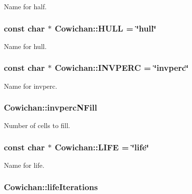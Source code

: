 Name for half. \hypertarget{class_cowichan_c0ca862afefd5d6ab8fefdbf47428b21}{
\subsubsection[{HULL}]{\setlength{\rightskip}{0pt plus 5cm}const char $\ast$ {\bf Cowichan::HULL} = \char`\"{}hull\char`\"{}}}
\label{class_cowichan_c0ca862afefd5d6ab8fefdbf47428b21}


Name for hull. \hypertarget{class_cowichan_0665b5094fb551e4f000502ec752a4e8}{
\subsubsection[{INVPERC}]{\setlength{\rightskip}{0pt plus 5cm}const char $\ast$ {\bf Cowichan::INVPERC} = \char`\"{}invperc\char`\"{}}}
\label{class_cowichan_0665b5094fb551e4f000502ec752a4e8}


Name for invperc. \hypertarget{class_cowichan_c637b7380ab889ed42652790a3c542c6}{
\subsubsection[{invpercNFill}]{ {\bf Cowichan::invpercNFill}}}
\label{class_cowichan_c637b7380ab889ed42652790a3c542c6}


Number of cells to fill. \hypertarget{class_cowichan_6d8355328c9a2e36321d3d33930f56b2}{
\subsubsection[{LIFE}]{\setlength{\rightskip}{0pt plus 5cm}const char $\ast$ {\bf Cowichan::LIFE} = \char`\"{}life\char`\"{}}}
\label{class_cowichan_6d8355328c9a2e36321d3d33930f56b2}


Name for life. \hypertarget{class_cowichan_edeb55a8b961f270ec35869dbba3afde}{
\subsubsection[{lifeIterations}]{ {\bf Cowichan::lifeIterations}}}
\label{class_cowichan_edeb55a8b961f270ec35869dbba3afde}


